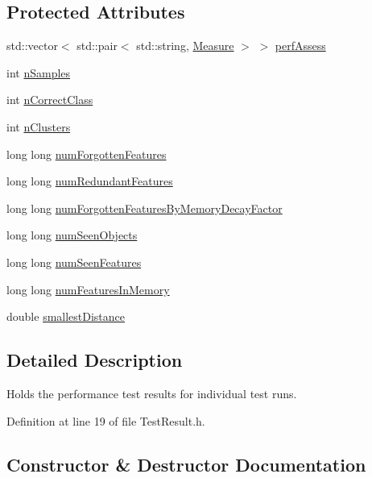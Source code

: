 \subsection*{Protected Attributes}
\begin{DoxyCompactItemize}
\item 
std\+::vector$<$ std\+::pair$<$ std\+::string, \hyperlink{class_measure}{Measure} $>$ $>$ \hyperlink{class_test_result_a7d451af5c02d15b3b8d117adbcdede57}{perf\+Assess}
\item 
int \hyperlink{class_test_result_a2986ed45ae3e5dd3287804d3e35f3830}{n\+Samples}
\item 
int \hyperlink{class_test_result_a35cefffa1f0be43a99b0061c03008c16}{n\+Correct\+Class}
\item 
int \hyperlink{class_test_result_add83898b67f41cc78be15efef7748ac0}{n\+Clusters}
\item 
long long \hyperlink{class_test_result_ac6db89d90c92fbc19b701c3e1327dabf}{num\+Forgotten\+Features}
\item 
long long \hyperlink{class_test_result_aa416470604df77c02a8f4a971f413e1a}{num\+Redundant\+Features}
\item 
long long \hyperlink{class_test_result_a1e421539c0074eeb06cc31ba177a724e}{num\+Forgotten\+Features\+By\+Memory\+Decay\+Factor}
\item 
long long \hyperlink{class_test_result_a5e10d3944bd5a8f6997547fb2faf4de6}{num\+Seen\+Objects}
\item 
long long \hyperlink{class_test_result_a3908b36b2834082b11fdbb3932a4908e}{num\+Seen\+Features}
\item 
long long \hyperlink{class_test_result_a9d7b76c3afe61c67ffd4a73af768e9c4}{num\+Features\+In\+Memory}
\item 
double \hyperlink{class_test_result_a9a58045656cd237ce1231b15b234f2c3}{smallest\+Distance}
\end{DoxyCompactItemize}


\subsection{Detailed Description}
Holds the performance test results for individual test runs. 

Definition at line 19 of file Test\+Result.\+h.



\subsection{Constructor \& Destructor Documentation}
\mbox{\label{class_test_result_af77fa5c098e06de9a1dd456169a6b329}} 
